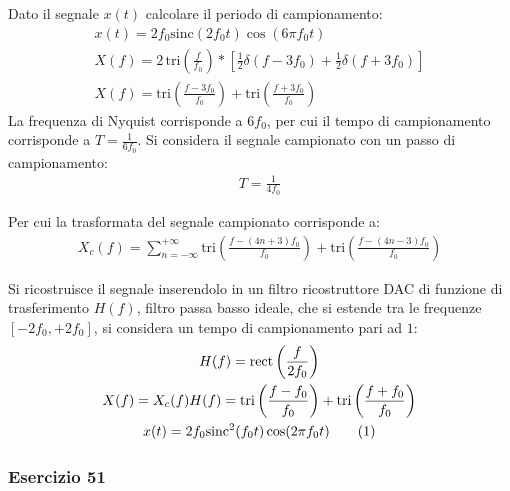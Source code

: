 \documentclass{article}
\newcommand{\rect}{\mathrm{rect}}
\newcommand{\sinc}{\mathrm{sinc}}
\newcommand{\tri}{\mathrm{tri}}
\newcommand{\tageq}{\tag{\stepcounter{equation}\theequation}}
\begin{document}
Dato il segnale $x(t)$ calcolare il periodo di campionamento:
\begin{gather*}
    x(t)=2f_0\sinc(2f_0t)\cos(6\pi f_0t)\\
    X(f)=\displaystyle2\,\tri \left(\frac{f}{f_0}\right)*\left[\frac{1}{2}\delta\left(f-3f_0\right)+\frac{1}{2}\delta(f+3f_0)\right]\\
    X(f)=\displaystyle\tri \left(\frac{f-3f_0}{f_0}\right)+\tri \left(\frac{f+3f_0}{f_0}\right)
\end{gather*}
La frequenza di Nyquist corrisponde a $6f_0$, per cui il tempo di campionamento corrisponde a $T=\displaystyle\frac{1}{6f_0}$. Si considera il segnale campionato con un 
passo di campionamento:
\begin{gather*}
    T=\displaystyle\frac{1}{4f_0}
\end{gather*}

Per cui la trasformata del segnale campionato corrisponde a:
\begin{gather*}
    X_c(f)=\displaystyle\sum_{n=-\infty}^{+\infty}\tri \left(\frac{f-(4n+3)f_0}{f_0}\right)+\tri \left(\frac{f-(4n-3)f_0}{f_0}\right)
\end{gather*}

Si ricostruisce il segnale inserendolo in un filtro ricostruttore DAC di funzione di trasferimento $H(f)$, filtro passa basso ideale, che si estende tra le 
frequenze $[-2f_0,+2f_0]$, si considera un tempo di campionamento pari ad $1$:
\begin{gather*}
    H(f)=\displaystyle\rect\left(\frac{f}{2f_0}\right)\\
    X(f)=X_c(f)H(f)=\displaystyle\tri \left(\frac{f-f_0}{f_0}\right)+\tri \left(\frac{f+f_0}{f_0}\right)\\
    x(t)=2f_0\sinc^2(f_0t)\cos(2\pi f_0t)\tageq
\end{gather*} 

\subsubsection*{Esercizio 51}
\end{document}
